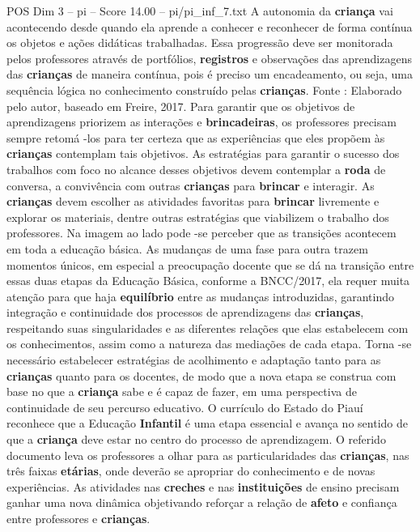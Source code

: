 \begin{textsample}{POS Dim 3 – pi – Score 14.00 – pi/pi\_inf\_7.txt}
A autonomia da \textbf{criança} vai acontecendo desde quando ela aprende a conhecer e reconhecer de forma contínua os objetos e ações didáticas trabalhadas.
Essa progressão deve ser monitorada pelos professores através de portfólios, \textbf{registros} e observações das aprendizagens das \textbf{crianças} de maneira contínua, pois é preciso um encadeamento, ou seja, uma sequência lógica no conhecimento construído pelas \textbf{crianças}.
Fonte : Elaborado pelo autor, baseado em Freire, 2017.
Para garantir que os objetivos de aprendizagens priorizem as interações e \textbf{brincadeiras}, os professores precisam sempre retomá -los para ter certeza que as experiências que eles propõem às \textbf{crianças} contemplam tais objetivos.
As estratégias para garantir o sucesso dos trabalhos com foco no alcance desses objetivos devem contemplar a \textbf{roda} de conversa, a convivência com outras \textbf{crianças} para \textbf{brincar} e interagir.
As \textbf{crianças} devem escolher as atividades favoritas para \textbf{brincar} livremente e explorar os materiais, dentre outras estratégias que viabilizem o trabalho dos professores.
Na imagem ao lado pode -se perceber que as transições acontecem em toda a educação básica.
As mudanças de uma fase para outra trazem momentos únicos, em especial a preocupação docente que se dá na transição entre essas duas etapas da Educação Básica, conforme a BNCC/2017, ela requer muita atenção para que haja \textbf{equilíbrio} entre as mudanças introduzidas, garantindo integração e continuidade dos processos de aprendizagens das \textbf{crianças}, respeitando suas singularidades e as diferentes relações que elas estabelecem com os conhecimentos, assim como a natureza das mediações de cada etapa.
Torna -se necessário estabelecer estratégias de acolhimento e adaptação tanto para as \textbf{crianças} quanto para os docentes, de modo que a nova etapa se construa com base no que a \textbf{criança} sabe e é capaz de fazer, em uma perspectiva de continuidade de seu percurso educativo.
O currículo do Estado do Piauí reconhece que a Educação \textbf{Infantil} é uma etapa essencial e avança no sentido de que a \textbf{criança} deve estar no centro do processo de aprendizagem.
O referido documento leva os professores a olhar para as particularidades das \textbf{crianças}, nas três faixas \textbf{etárias}, onde deverão se apropriar do conhecimento e de novas experiências.
As atividades nas \textbf{creches} e nas \textbf{instituições} de ensino precisam ganhar uma nova dinâmica objetivando reforçar a relação de \textbf{afeto} e confiança entre professores e \textbf{crianças}.

\end{textsample}
